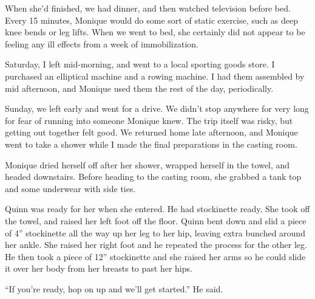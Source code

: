 When she'd finished, we had dinner, and then watched television before bed. Every 15
minutes, Monique would do some sort of static exercise, such as deep knee bends or leg lifts.
When we went to bed, she certainly did not appear to be feeling any ill effects from a week of
immobilization.

Saturday, I left mid-morning, and went to a local sporting goods store. I purchased an
elliptical machine and a rowing machine. I had them assembled by mid afternoon, and Monique used
them the rest of the day, periodically.

Sunday, we left early and went for a drive. We didn't stop anywhere for very long for fear
of running into someone Monique knew. The trip itself was risky, but getting out together felt
good. We returned home late afternoon, and Monique went to take a shower while I made the final
preparations in the casting room.

\begin{thought}
Monique dried herself off after her shower, wrapped herself in the towel, and headed
downstairs. Before heading to the casting room, she grabbed a tank top and some underwear with
side ties.

Quinn was ready for her when she entered. He had stockinette ready. She took off the towel,
and raised her left foot off the floor. Quinn bent down and slid a piece of 4'' stockinette all
the way up her leg to her hip, leaving extra bunched around her ankle. She raised her right foot
and he repeated the process for the other leg. He then took a piece of 12'' stockinette and she
raised her arms so he could slide it over her body from her breasts to past her hips.
\end{thought}

``If you're ready, hop on up and we'll get started.'' He said.

